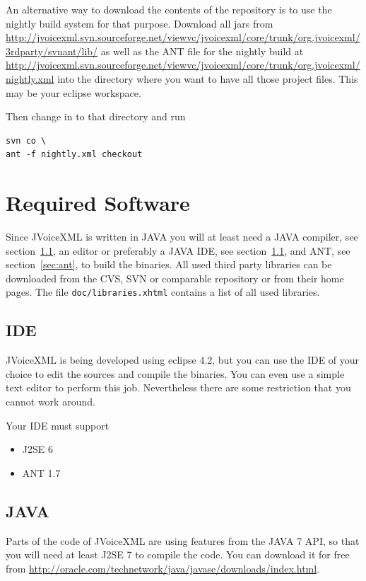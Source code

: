 \documentclass[11pt,a4paper]{article}
\begin{document}
An alternative way to download the contents of the repository is to use the 
nightly build system for that purpose. Download all jars from
\url{http://jvoicexml.svn.sourceforge.net/viewvc/jvoicexml/core/trunk/org.jvoicexml/3rdparty/svnant/lib/}
as well as the ANT file for the nightly build at
\url{http://jvoicexml.svn.sourceforge.net/viewvc/jvoicexml/core/trunk/org.jvoicexml/nightly.xml}
into the directory where you want to have all those project files. This may be
your eclipse workspace.

Then change in to that directory and run
\begin{lstlisting}
svn co \
ant -f nightly.xml checkout
\end{lstlisting}


\section{Required Software}
\label{sec:required-software}

Since JVoiceXML is written in JAVA you will at least need a
JAVA compiler, see section~\ref{sec:ide}, an editor or preferably a JAVA
IDE, see section~\ref{sec:ide}, and ANT, see section~\ref{sec:ant}, to build the
binaries. All used third party libraries can be downloaded from the CVS, SVN or
comparable repository or from their home pages. The file
\texttt{doc/libraries.xhtml} contains a list of all used libraries.


\subsection{IDE}
\label{sec:ide}

JVoiceXML is being developed using eclipse 4.2, but you can use the IDE of your
choice to edit the sources and compile the binaries. You can even use a simple
text editor to perform this job. Nevertheless there are some restriction that
you cannot work around.

Your IDE must support

\begin{itemize}
\item J2SE 6
\item ANT 1.7
\end{itemize}

\subsection{JAVA}
\label{sec:java}

Parts of the code of JVoiceXML are using features from the JAVA 7 API, so that
you will need at least J2SE 7 to compile the code. You can download it
for free from \url{http://oracle.com/technetwork/java/javase/downloads/index.html}.
\end{document}

